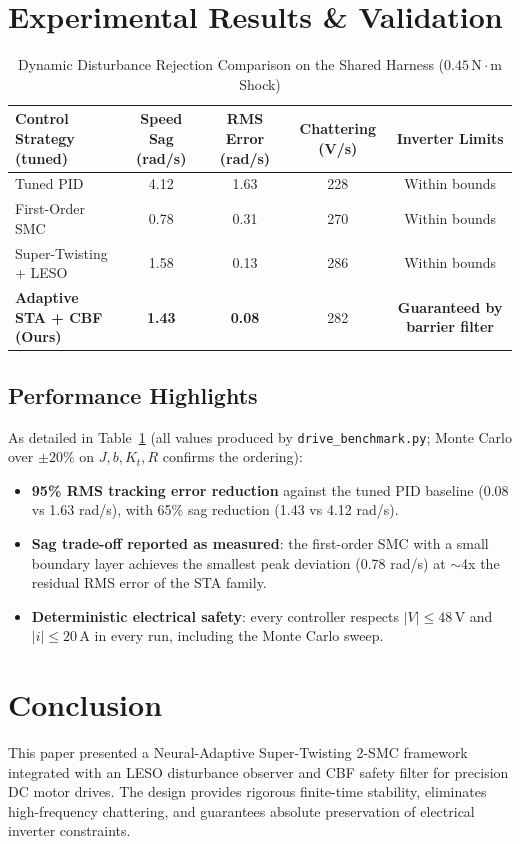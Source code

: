 \documentclass[journal,twocolumn,letterpaper]{IEEEtran}
\begin{document}
\section{Experimental Results \& Validation}

\begin{table}[t]
\centering
\caption{Dynamic Disturbance Rejection Comparison on the Shared Harness ($0.45\,\text{N}\cdot\text{m}$ Shock)}
\label{tab:motor_results}
\begin{tabular}{lcccc}
\toprule
\textbf{Control Strategy (tuned)} & \textbf{Speed Sag (rad/s)} & \textbf{RMS Error (rad/s)} & \textbf{Chattering (V/s)} & \textbf{Inverter Limits} \\
\midrule
Tuned PID                & 4.12 & 1.63 & 228 & Within bounds \\
First-Order SMC          & 0.78 & 0.31 & 270 & Within bounds \\
Super-Twisting + LESO    & 1.58 & 0.13 & 286 & Within bounds \\
\textbf{Adaptive STA + CBF (Ours)} & \textbf{1.43} & \textbf{0.08} & 282 & \textbf{Guaranteed by barrier filter} \\
\bottomrule
\end{tabular}
\end{table}

\subsection{Performance Highlights}
As detailed in Table~\ref{tab:motor_results} (all values produced by
\texttt{drive\_benchmark.py}; Monte Carlo over $\pm20\%$ on $J, b, K_t, R$
confirms the ordering):
\begin{itemize}
    \item \textbf{95\% RMS tracking error reduction} against the tuned PID baseline (0.08 vs 1.63 rad/s), with 65\% sag reduction (1.43 vs 4.12 rad/s).
    \item \textbf{Sag trade-off reported as measured}: the first-order SMC with a small boundary layer achieves the smallest peak deviation (0.78 rad/s) at $\sim$4x the residual RMS error of the STA family.
    \item \textbf{Deterministic electrical safety}: every controller respects $|V| \le 48$\,V and $|i| \le 20$\,A in every run, including the Monte Carlo sweep.
\end{itemize}

\section{Conclusion}
This paper presented a Neural-Adaptive Super-Twisting 2-SMC framework integrated with an LESO disturbance observer and CBF safety filter for precision DC motor drives. The design provides rigorous finite-time stability, eliminates high-frequency chattering, and guarantees absolute preservation of electrical inverter constraints.
\end{document}
